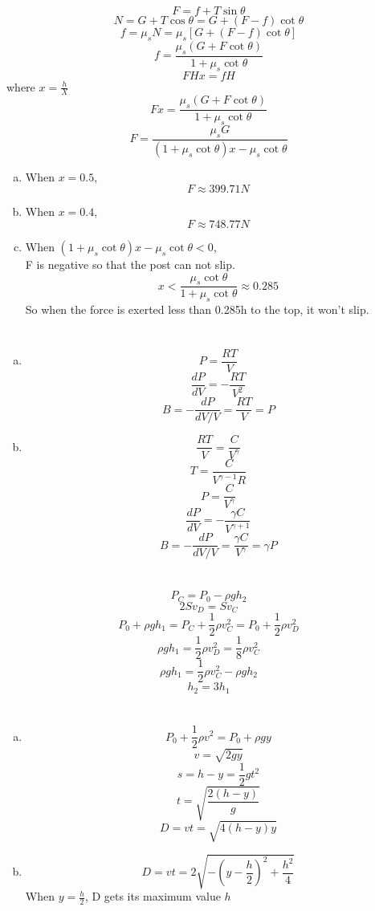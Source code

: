\documentclass{article}
\begin{document}
\section{}

$$F=f+T\sin\theta$$
$$N=G+T\cos\theta=G+(F-f)\cot\theta$$
$$f=\mu_sN=\mu_s[G+(F-f)\cot\theta]$$
$$f=\frac{\mu_s(G+F\cot\theta)}{1+\mu_s\cot\theta}$$
$$FHx=fH$$
where $x=\frac{h}{X}$
$$Fx=\frac{\mu_s(G+F\cot\theta)}{1+\mu_s\cot\theta}$$
$$F=\frac{\mu_sG}{(1+\mu_s\cot\theta)x-\mu_s\cot\theta}$$

\begin{enumerate}[(a)]
\item
When $x=0.5$,
$$F\approx399.71N$$
\item
When $x=0.4$,
$$F\approx748.77N$$
\item
When $(1+\mu_s\cot\theta)x-\mu_s\cot\theta<0$,\\
F is negative so that the post can not slip.
$$x<\frac{\mu_s\cot\theta}{1+\mu_s\cot\theta}\approx0.285$$
So when the force is exerted less than 0.285h to the top, it won't slip.
\end{enumerate}

\section{}
\begin{enumerate}[(a)]
\item
$$P=\frac{RT}{V}$$
$$\frac{dP}{dV}=-\frac{RT}{V^2}$$
$$B=-\frac{dP}{dV/V}=\frac{RT}{V}=P$$
\item
$$\frac{RT}{V}=\frac{C}{V^\gamma}$$
$$T=\frac{C}{V^{\gamma-1}R}$$
$$P=\frac{C}{V^\gamma}$$
$$\frac{dP}{dV}=-\frac{\gamma C}{V^{\gamma+1}}$$
$$B=-\frac{dP}{dV/V}=\frac{\gamma C}{V^\gamma}=\gamma P$$
\end{enumerate}

\section{}
$$P_C=P_0-\rho gh_2$$
$$2Sv_D=Sv_C$$
$$P_0+\rho gh_1=P_C+\frac{1}{2}\rho v_C^2=P_0+\frac{1}{2}\rho v_D^2$$
$$\rho gh_1=\frac{1}{2}\rho v_D^2=\frac{1}{8}\rho v_C^2$$
$$\rho gh_1=\frac{1}{2}\rho v_C^2-\rho gh_2$$
$$h_2=3h_1$$

\section{}
\begin{enumerate}[(a)]
\item
$$P_0+\frac{1}{2}\rho v^2=P_0+\rho gy$$
$$v=\sqrt{2gy}$$
$$s=h-y=\frac{1}{2}gt^2$$
$$t=\sqrt{\frac{2(h-y)}{g}}$$
$$D=vt=\sqrt{4(h-y)y}$$
\item
$$D=vt=2\sqrt{-\left(y-\frac{h}{2}\right)^2+\frac{h^2}{4}}$$
When $y=\frac{h}{2}$, D gets its maximum value $h$
\end{enumerate}
\end{document}
